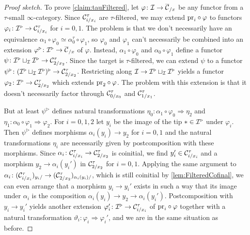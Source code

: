 \begin{proof}[Proof sketch]
	To prove \cref{claim:tauFiltered}, let $\varphi\colon \Ii\rightarrow \ov\Cc_{/x}$ be any functor from a $\tau$-small $\infty$-category. Since $\mathcal{C}_{i/x_i}^\tau$ are $\tau$-filtered, we may extend ${\operatorname{pr}_i}\circ\varphi$ to functors $\varphi_i\colon \mathcal{I}^\triangleright \rightarrow \mathcal{C}_{i/x_i}^\tau$ for $i=0,1$. The problem is that we don't necessarily have an equivalence $\alpha_1\circ\varphi_0\simeq \alpha_0^\tau\circ \varphi_1$, so $\varphi_0$ and $\varphi_1$ can't necessarily be combined into an extension $\varphi^\triangleright\colon \Ii^\triangleright \rightarrow \ov\Cc_{/x}$ of $\varphi$. Instead, $\alpha_1\circ\varphi_0$ and $\alpha_0\circ \varphi_1$ define a functor $\psi\colon \mathcal{I}^\triangleright\sqcup_{\mathcal{I}}\mathcal{I}^\triangleright\rightarrow \mathcal{C}_{2/x_2}^\tau$. Since the target is $\tau$-filtered, we can extend $\psi$ to a functor $\psi^\triangleright\colon (\mathcal{I}^\triangleright\sqcup_{\mathcal{I}}\mathcal{I}^\triangleright)^\triangleright\rightarrow \mathcal{C}_{2/x_2}^\tau$. Restricting along $\mathcal{I}\rightarrow \mathcal{I}^\triangleright\sqcup_{\mathcal{I}}\mathcal{I}^\triangleright$ yields a functor $\varphi_2\colon \mathcal{I}^\triangleright \rightarrow \mathcal{C}_{2/x_2}^\tau$ which extends ${\operatorname{pr}_2}\circ\varphi$. The problem with this extension is that it doesn't necessarily factor through $\mathcal{C}_{0/x_0}^\tau$ and $\mathcal{C}_{1/x_1}^\tau$. 
	
	But at least $\psi^\triangleright$ defines natural transformations $\eta_0\colon\alpha_1\circ\varphi_0\Rightarrow \eta_2$ and $\eta_1\colon\alpha_0\circ\varphi_1\Rightarrow \varphi_2$. For $i=0,1,2$ let $y_i$ be the image of the tip $*\in\mathcal{I}^\triangleright$ under $\varphi_i$. Then $\psi^\triangleright$ defines morphisms $\alpha_i(y_i)\rightarrow y_2$ for $i=0,1$ and the natural transformations $\eta_i$ are necessarily given by postcomposition with these morphisms. Since $\alpha_i\colon \mathcal{C}_{i/x_i}^\tau\rightarrow \mathcal{C}_{2/x_2}^\tau$ is coinitial, we find $y_i'\in \mathcal{C}_{i/x_i}^\tau$ and a morphism $y_2\rightarrow \alpha_i(y_i')$ in $\mathcal{C}_{2/x_2}^\tau$ for $i=0,1$. Applying the same argument to $\alpha_i\colon(\mathcal{C}_{i/x_i}^\tau)_{y_i/}\rightarrow (\mathcal{C}_{2/x_2}^\tau)_{\alpha_i(y_i)/}$, which is still coinitial by \cref{lem:FilteredCofinal}, we can even arrange that a morphism $y_i\rightarrow y_i'$ exists in such a way that its image under $\alpha_i$ is the composition $\alpha_i(y_i)\rightarrow y_2\rightarrow \alpha_i(y_i')$. Postcomposition with $y_i\rightarrow y_i'$ yields another extension $\varphi_i'\colon \mathcal{I}^\triangleright\rightarrow \mathcal{C}_{i/x_i}^\tau$ of ${\operatorname{pr}_i}\circ\varphi$ together with a natural transformation $\vartheta_i\colon \varphi_i\Rightarrow \varphi_i'$, and we are in the same situation as before.
	

\end{proof}
